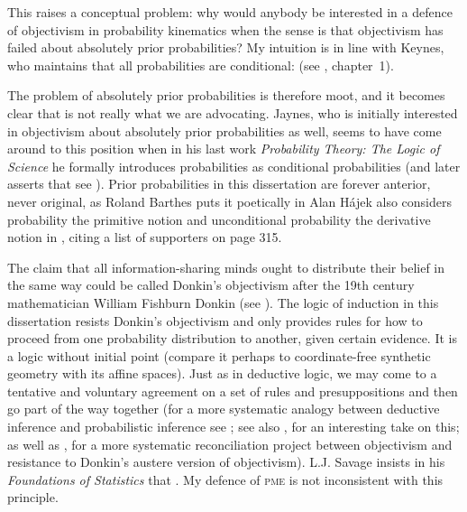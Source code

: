 \documentclass[phd,12pt,oneside]{ubcthesis}
\begin{document}
This raises a conceptual problem: why would anybody be interested in a
defence of objectivism in probability kinematics when the sense is
that objectivism has failed about absolutely prior probabilities? My
intuition is in line with Keynes, who maintains that all probabilities
are conditional:  (see
, chapter~1).

The problem of absolutely prior probabilities is therefore moot, and
it becomes clear that  is not really what we are
advocating. Jaynes, who is initially interested in objectivism about
absolutely prior probabilities as well, seems to have come around to
this position when in his last work \emph{Probability Theory: The
  Logic of Science} he formally introduces probabilities as
conditional probabilities (and later asserts that  see
). Prior probabilities in this
dissertation are forever anterior, never original, as Roland Barthes
puts it poetically in  Alan H{\'a}jek
also considers probability the primitive notion and unconditional
probability the derivative notion in , citing a
list of supporters on page 315.

The claim that all information-sharing minds ought to distribute their
belief in the same way could be called Donkin's objectivism after the
19th century mathematician William Fishburn Donkin (see
). The logic of induction in this dissertation
resists Donkin's objectivism and only provides rules for how to
proceed from one probability distribution to another, given certain
evidence. It is a logic without initial point (compare it perhaps to
coordinate-free synthetic geometry with its affine spaces). Just as in
deductive logic, we may come to a tentative and voluntary agreement on
a set of rules and presuppositions and then go part of the way
together (for a more systematic analogy between deductive inference
and probabilistic inference see ; see also
, for an interesting take on this; as well as
, for a more systematic reconciliation project
between objectivism and resistance to Donkin's austere version of
objectivism). L.J. Savage insists in his \emph{Foundations of
  Statistics} that 
. My defence of \textsc{pme} is not
inconsistent with this principle.
\end{document}
